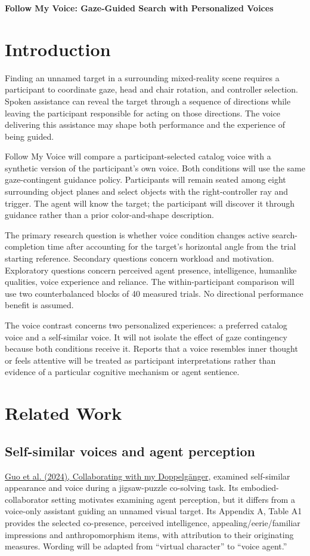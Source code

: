 \documentclass[11pt,letterpaper]{article}
\begin{document}
{\LARGE\bfseries Follow My Voice: Gaze-Guided Search with Personalized Voices}\par
\section{Introduction}
Finding an unnamed target in a surrounding mixed-reality scene requires a participant to coordinate gaze, head and chair rotation, and controller selection. Spoken assistance can reveal the target through a sequence of directions while leaving the participant responsible for acting on those directions. The voice delivering this assistance may shape both performance and the experience of being guided.

Follow My Voice will compare a participant-selected catalog voice with a synthetic version of the participant's own voice. Both conditions will use the same gaze-contingent guidance policy. Participants will remain seated among eight surrounding object planes and select objects with the right-controller ray and trigger. The agent will know the target; the participant will discover it through guidance rather than a prior color-and-shape description.

The primary research question is whether voice condition changes active search-completion time after accounting for the target's horizontal angle from the trial starting reference. Secondary questions concern workload and motivation. Exploratory questions concern perceived agent presence, intelligence, humanlike qualities, voice experience and reliance. The within-participant comparison will use two counterbalanced blocks of 40 measured trials. No directional performance benefit is assumed.

The voice contrast concerns two personalized experiences: a preferred catalog voice and a self-similar voice. It will not isolate the effect of gaze contingency because both conditions receive it. Reports that a voice resembles inner thought or feels attentive will be treated as participant interpretations rather than evidence of a particular cognitive mechanism or agent sentience.
\section{Related Work}
\subsection{Self-similar voices and agent perception}
\href{https://doi.org/10.1145/3651288}{Guo et al. (2024), Collaborating with my Doppelg\"anger}, examined self-similar appearance and voice during a jigsaw-puzzle co-solving task. Its embodied-collaborator setting motivates examining agent perception, but it differs from a voice-only assistant guiding an unnamed visual target. Its Appendix A, Table A1 provides the selected co-presence, perceived intelligence, appealing/eerie/familiar impressions and anthropomorphism items, with attribution to their originating measures. Wording will be adapted from ``virtual character'' to ``voice agent.''
\end{document}
